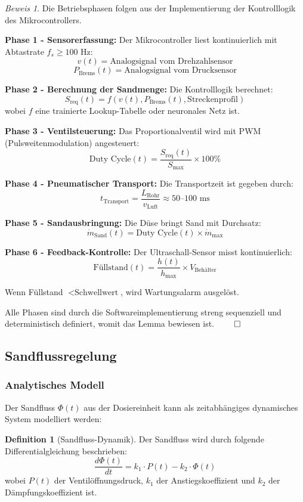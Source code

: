 \documentclass[a4paper,12pt]{article}
\theoremstyle{definition}
\newtheorem{definition}{Definition}
\theoremstyle{remark}
\newtheorem*{beweis}{Beweis}
\begin{document}
\begin{beweis}
Die Betriebsphasen folgen aus der Implementierung der Kontrolllogik des Mikrocontrollers.

\textbf{Phase 1 - Sensorerfassung:}
Der Mikrocontroller liest kontinuierlich mit Abtastrate $f_s \geq 100$ Hz:
\[v(t) = \text{Analogsignal vom Drehzahlsensor}\]
\[P_{\text{Brems}}(t) = \text{Analogsignal vom Drucksensor}\]

\textbf{Phase 2 - Berechnung der Sandmenge:}
Die Kontrolllogik berechnet:
\[S_{\text{req}}(t) = f(v(t), P_{\text{Brems}}(t), \text{Streckenprofil})\]
wobei $f$ eine trainierte Lookup-Tabelle oder neuronales Netz ist.

\textbf{Phase 3 - Ventilsteuerung:}
Das Proportionalventil wird mit PWM (Pulsweitenmodulation) angesteuert:
\[\text{Duty Cycle}(t) = \frac{S_{\text{req}}(t)}{S_{\max}} \times 100\%\]

\textbf{Phase 4 - Pneumatischer Transport:}
Die Transportzeit ist gegeben durch:
\[t_{\text{Transport}} = \frac{L_{\text{Rohr}}}{v_{\text{Luft}}} \approx 50\text{--}100 \text{ ms}\]

\textbf{Phase 5 - Sandausbringung:}
Die Düse bringt Sand mit Durchsatz:
\[\dot{m}_{\text{Sand}}(t) = \text{Duty Cycle}(t) \times \dot{m}_{\max}\]

\textbf{Phase 6 - Feedback-Kontrolle:}
Der Ultraschall-Sensor misst kontinuierlich:
\[\text{Füllstand}(t) = \frac{h(t)}{h_{\max}} \times V_{\text{Behälter}}\]

Wenn Füllstand $< \text{Schwellwert}$, wird Wartungsalarm ausgelöst.

Alle Phasen sind durch die Softwareimplementierung streng sequenziell und deterministisch definiert, womit das Lemma bewiesen ist. $\qed$
\end{beweis}

\subsection{Sandflussregelung}

\subsubsection{Analytisches Modell}

Der Sandfluss $\Phi(t)$ aus der Dosiereinheit kann als zeitabhängiges dynamisches System modelliert werden:

\begin{definition}[Sandfluss-Dynamik]
	Der Sandfluss wird durch folgende Differentialgleichung beschrieben:
	\[
	\frac{d\Phi(t)}{dt} = k_1 \cdot P(t) - k_2 \cdot \Phi(t)
	\]
	wobei $P(t)$ der Ventilöffnungsdruck, $k_1$ der Anstiegskoeffizient und $k_2$ der Dämpfungskoeffizient ist.
\end{definition}
\end{document}
